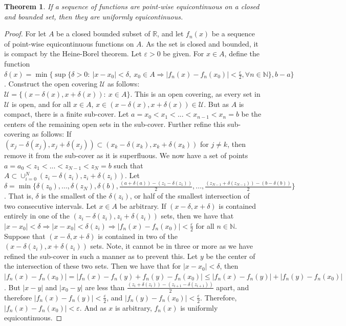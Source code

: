 \documentclass[oneside]{book}
\theoremstyle{mystyle}
\newtheorem{theorem}{Theorem}[section]
\begin{document}
\begin{theorem}
If a sequence of functions are point-wise equicontinuous on a closed and bounded set, then they are uniformly equicontinuous.
\end{theorem}
\begin{proof}
For let $A$ be a closed bounded subset of $\mathbb{R}$, and let $f_n(x)$ be a sequence of point-wise equicontinuous functions on $A$. As the set is closed and bounded, it is compact by the Heine-Borel theorem. Let $\varepsilon>0$ be given. For $x\in A$, define the function $\delta(x) = \min\{\sup\{\delta>0:\ |x-x_0|<\delta,\ x_0\in A \Rightarrow |f_n(x)-f_n(x_0)|<\frac{\varepsilon}{2}, \forall n\in\mathbb{N}\},b-a\}$. Construct the open covering $\mathcal{U}$ as follows: $\mathcal{U} = \{(x-\delta(x),x+\delta(x)):\ x\in A\}$. This is an open covering, as every set in $\mathcal{U}$ is open, and for all $x\in A$, $x\in(x-\delta(x),x+\delta(x))\in\mathcal{U}$. But as $A$ is compact, there is a finite sub-cover. Let $a=x_0<x_1<...<x_{n-1}<x_n=b$ be the centers of the remaining open sets in the sub-cover. Further refine this sub-covering as follows: If $(x_j-\delta(x_j),x_j+\delta(x_j))\subset (x_k-\delta(x_k),x_k+\delta(x_k))$ for $j\ne k$, then remove it from the sub-cover as it is superfluous. We now have a set of points $a=a_0<z_1<...<z_{N-1}<z_N=b$ such that $A \subset \cup_{i=0}^{N} (z_i-\delta(z_i),z_i+\delta(z_i))$. Let $\delta = \min\{\delta(z_0),...,\delta(z_N),\delta(b), \frac{(a+\delta(a)) - (z_1-\delta(z_1))}{2}, ..., \frac{(z_{N-1} + \delta(z_{N-1})) - (b-\delta(b))}{2}\}$. That is, $\delta$ is the smallest of the $\delta(z_i)$, or half of the smallest intersection of two consecutive intervals. Let $x\in A$ be arbitrary. If $(x-\delta,x+\delta)$ is contained entirely in one of the $(z_i-\delta(z_i),z_i+\delta(z_i))$ sets, then we have that $|x-x_0|<\delta \Rightarrow |x-x_0| <\delta(z_i) \Rightarrow |f_n(x)-f_n(x_0)|<\frac{\varepsilon}{2}$ for all $n\in\mathbb{N}$. Suppose that $(x-\delta,x+\delta)$ is contained in two of the $(x-\delta(z_i),x+\delta(z_i))$ sets. Note, it cannot be in three or more as we have refined the sub-cover in such a manner as to prevent this. Let $y$ be the center of the intersection of these two sets. Then we have that for $|x-x_0|<\delta$, then $|f_n(x)-f_n(x_0)| = |f_n(x) - f_n(y) + f_n(y) - f_n(x_0)| \leq |f_n(x) - f_n(y)| + |f_n(y) - f_n(x_0)|$. But $|x-y|$ and $|x_0-y|$ are less than $\frac{(z_i + \delta(z_i))-(z_{i+1}-\delta(z_{i+1}))}{2}$ apart, and therefore $|f_n(x) - f_n(y)|<\frac{\varepsilon}{2}$, and $|f_n(y) - f_n(x_0)| < \frac{\varepsilon}{2}$. Therefore, $|f_n(x) - f_n(x_0)|<\varepsilon$. And as $x$ is arbitrary, $f_n(x)$ is uniformly equicontinuous.
\end{proof}
\end{document}
